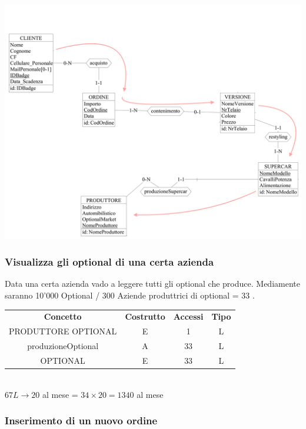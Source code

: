 \documentclass[11pt]{article}
\begin{document}
\begin{center}
    \includegraphics[scale=0.50]{images/navigationSchemes/ordiniCliente.png}
\end{center}

\subsubsection{Visualizza gli optional di una certa azienda} 

Data una certa azienda vado a leggere tutti gli optional che produce. Mediamente
saranno 10'000 Optional / 300 Aziende produttrici di optional = 33 .

\begin{table}[H]
    \centering
    \begin{tabular}{ c c c c } 
        \rowcolor{red!20!}
        \textbf{Concetto} & \textbf{Costrutto} & \textbf{Accessi} &
        \textbf{Tipo}\\ 
        PRODUTTORE OPTIONAL & E & 1 & L \\ 
        produzioneOptional & A & 33 & L \\
        OPTIONAL & E & 33 & L \\ 
    \end{tabular}\\
    \( 67L \rightarrow 20\) al mese = \( 34 \times 20 = 1340 \) al mese
\end{table}

\subsubsection{Inserimento di un nuovo ordine} 
\end{document}
